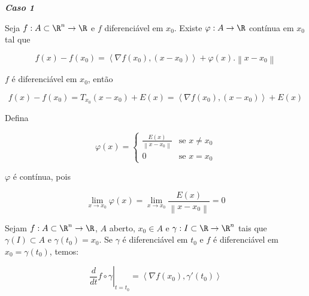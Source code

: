 \documentclass[11pt, oneside, a4paper]{gsm-l}
\begin{document}
\textit{\textbf{Caso 1}}

\begin{lem} \label{lem01}
    Seja $f:A \subset \R^n  \to \R$ e $f$ diferenciável em $x_0$. Existe $\varphi :A \to \R$ contínua em $x_0$ tal que

\[
f\left( x \right) - f\left( {x_0 } \right) = \left\langle {\nabla f\left( {x_0 } \right),\left( {x - x_0 } \right)} \right\rangle  + \varphi \left( x \right).\left\| {x - x_0 } \right\|
\]
\end{lem}

\begin{dem}
$f$ é diferenciável em $x_0$, então

\[
f\left( x \right) - f\left( {x_0 } \right) = T_{x_0 } \left( {x - x_0 } \right) + E\left( x \right) = \left\langle {\nabla f\left( {x_0 } \right),\left( {x - x_0 } \right)} \right\rangle  + E\left( x \right)
\]

Defina

\begin{equation*}
\varphi(x)=\left\{ \begin{array}{cl}\displaystyle
\frac{{E(x)}}{{\left\| {x - x_0 } \right\|}} & \textrm{se }x \ne x_0\\
0 & \textrm{se }x=x_0\end{array}\right.
\end{equation*}

$\varphi$ é contínua, pois

\[
\mathop {\lim }\limits_{x \to x_0 } \varphi \left( x \right) = \mathop {\lim }\limits_{x \to x_0 } \frac{{E\left( x \right)}}
{{\left\| {x - x_0 } \right\|}} = 0
\]

\end{dem}

\begin{teo}
    Sejam $f:A \subset \R^n \to \R$, $A$ aberto, $x_0 \in A$ e $\gamma: I \subset \R \to \R^n$ tais que $\gamma \left( I \right) \subset A$ e $\gamma \left( {t_0 } \right) = x_0$. Se $\gamma$ é diferenciável em $t_0$ e $f$ é diferenciável em $x_0  = \gamma \left( {t_0 } \right)$, temos:

\[
\left. {\frac{d}
{{dt}}f \circ \gamma } \right|_{t = t_0 }  = \left\langle {\nabla f\left( {x_0 } \right),\gamma '\left( {t_0 } \right)} \right\rangle
\]

\end{teo}
\end{document}
